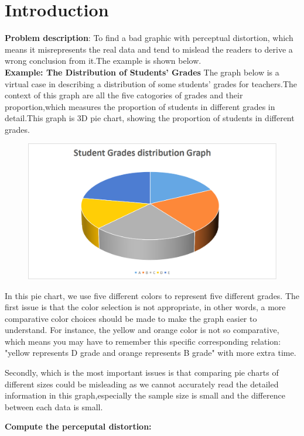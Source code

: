 
\section{Introduction}
\label{sec:intro}
\textbf{Problem description}:
 To find a bad graphic with perceptual distortion, which means it misrepresents the real data and tend to mislead the readers to derive a wrong conclusion from it.The example is shown below.\\
 
\textbf{Example: The Distribution of Students' Grades }
The graph below is a virtual case in describing a distribution of some students' grades for teachers.The context of this graph are all the five catogories of grades and their proportion,which measures the proportion of students in different grades in detail.This graph is 3D pie chart, showing the proportion of students in different grades. 

\begin{figure}[h]
	\centering
	\includegraphics[width=0.7\linewidth]{img/pie_chart}
	\caption{}
	\label{fig:piechart}
\end{figure}

In this pie chart, we use five different colors to represent five different grades. The first issue is that the color selection is not appropriate, in other words, a more comparative color choices should be made to make the graph easier to understand. For instance, the yellow and orange color is not so comparative, which means you may have to remember this specific corresponding relation: "yellow represents D grade and orange represents B grade" with more extra time. 

Secondly, which is the most important issues is that comparing pie charts of different sizes could be misleading as we cannot accurately read the detailed information in this graph,especially the sample size is small and the difference between each data is small.

 
\textbf{Compute the perceputal distortion:}

